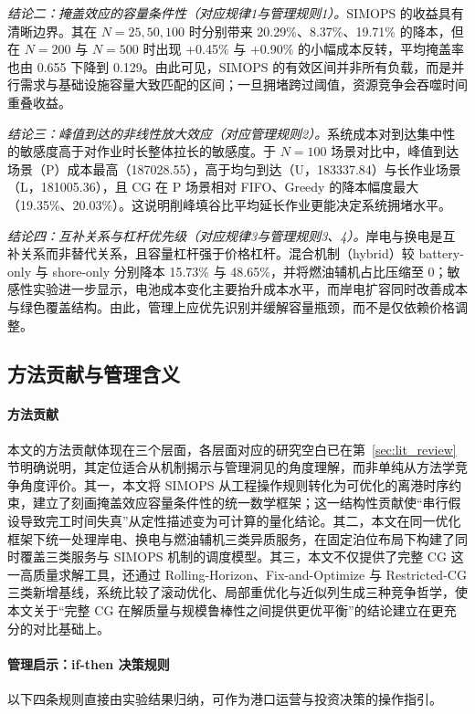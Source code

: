 \documentclass[UTF8, a4paper, 12pt]{ctexart}
\theoremstyle{plain}
\theoremstyle{definition}
\theoremstyle{remark}
\begin{document}
\emph{结论二：掩盖效应的容量条件性（对应规律1与管理规则1）。}SIMOPS 的收益具有清晰边界。其在 $N=25,50,100$ 时分别带来 20.29\%、8.37\%、19.71\% 的降本，但在 $N=200$ 与 $N=500$ 时出现 +0.45\% 与 +0.90\% 的小幅成本反转，平均掩盖率也由 0.655 下降到 0.129。由此可见，SIMOPS 的有效区间并非所有负载，而是并行需求与基础设施容量大致匹配的区间；一旦拥堵跨过阈值，资源竞争会吞噬时间重叠收益。

\emph{结论三：峰值到达的非线性放大效应（对应管理规则2）。}系统成本对到达集中性的敏感度高于对作业时长整体拉长的敏感度。于 $N=100$ 场景对比中，峰值到达场景（P）成本最高（187028.55），高于均匀到达（U，183337.84）与长作业场景（L，181005.36），且 CG 在 P 场景相对 FIFO、Greedy 的降本幅度最大（19.35\%、20.03\%）。这说明削峰填谷比平均延长作业更能决定系统拥堵水平。

\emph{结论四：互补关系与杠杆优先级（对应规律3与管理规则3、4）。}岸电与换电是互补关系而非替代关系，且容量杠杆强于价格杠杆。混合机制（hybrid）较 battery-only 与 shore-only 分别降本 15.73\% 与 48.65\%，并将燃油辅机占比压缩至 0；敏感性实验进一步显示，电池成本变化主要抬升成本水平，而岸电扩容同时改善成本与绿色覆盖结构。由此，管理上应优先识别并缓解容量瓶颈，而不是仅依赖价格调整。

\subsection{方法贡献与管理含义}
\label{sec:contributions}

\paragraph{方法贡献}
本文的方法贡献体现在三个层面，各层面对应的研究空白已在第~\ref{sec:lit_review} 节明确说明，其定位适合从机制揭示与管理洞见的角度理解，而非单纯从方法学竞争角度评价。其一，本文将 SIMOPS 从工程操作规则转化为可优化的离港时序约束，建立了刻画掩盖效应容量条件性的统一数学框架；这一结构性贡献使“串行假设导致完工时间失真”从定性描述变为可计算的量化结论。其二，本文在同一优化框架下统一处理岸电、换电与燃油辅机三类异质服务，在固定泊位布局下构建了同时覆盖三类服务与 SIMOPS 机制的调度模型。其三，本文不仅提供了完整 CG 这一高质量求解工具，还通过 Rolling-Horizon、Fix-and-Optimize 与 Restricted-CG 三类新增基线，系统比较了滚动优化、局部重优化与近似列生成三种竞争哲学，使本文关于“完整 CG 在解质量与规模鲁棒性之间提供更优平衡”的结论建立在更充分的对比基础上。

\paragraph{管理启示：if-then 决策规则}
以下四条规则直接由实验结果归纳，可作为港口运营与投资决策的操作指引。
\end{document}
